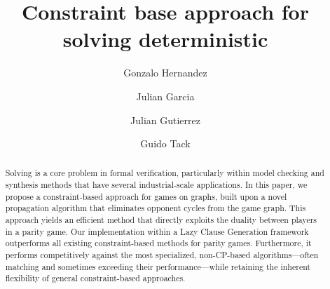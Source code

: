 \documentclass[preprint,12pt,authoryear]{elsarticle}
\begin{document}
\begin{frontmatter}



\title{Constraint base approach for solving deterministic \wregulargames} %

\author[label1,label3]{Gonzalo Hernandez}
\author[label1]{Julian Garcia}
\author[label2]{Julian Gutierrez}
\author[label3]{Guido Tack}






\begin{abstract}
Solving \wregulargames is a core problem in formal verification, particularly within model checking and synthesis methods that have several industrial-scale applications. In this paper, we propose a constraint-based approach for games on graphs, built upon a novel propagation algorithm that eliminates opponent cycles from the game graph. This approach yields an efficient method that directly exploits the duality between players in a parity game. Our implementation within a Lazy Clause Generation framework outperforms all existing constraint-based methods for parity games. Furthermore, it performs competitively against the most specialized, non-CP-based algorithms---often matching and sometimes exceeding their performance---while retaining the inherent flexibility of general constraint-based approaches. 


\end{abstract}
\end{frontmatter}
\end{document}
